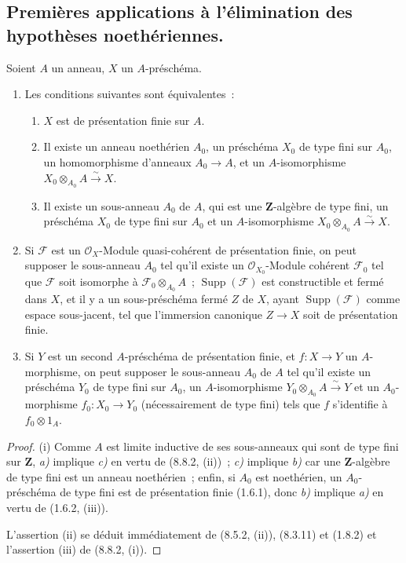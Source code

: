 \subsection{Premières applications à l'élimination des hypothèses noethériennes.}
\label{subsection:IV.8.9-fr}

\begin{proposition}[8.9.1]
Soient $A$ un anneau, $X$ un $A$-préschéma.
\begin{enumerate}
\item[\textup{(i)}] Les conditions suivantes sont équivalentes~:
\begin{enumerate}
\item[\emph{a)}] $X$ est de présentation finie sur $A$.
\item[\emph{b)}] Il existe un anneau noethérien $A_0$, un préschéma $X_0$ de
type fini sur $A_0$, un homomorphisme d'anneaux $A_0\to A$, et un
$A$-isomorphisme $X_0\otimes_{A_0}A\xrightarrow{\sim}X$.
\item[\emph{c)}] Il existe un sous-anneau $A_0$ de $A$, qui est une
$\mathbf Z$-algèbre de type fini, un préschéma $X_0$ de type fini sur $A_0$ et
un $A$-isomorphisme $X_0\otimes_{A_0}A\xrightarrow{\sim}X$.
\end{enumerate}
\item[\textup{(ii)}] Si $\mathcal F$ est un $\mathcal O_X$-Module quasi-cohérent de
présentation finie, on peut supposer le sous-anneau $A_0$ tel qu'il existe un
$\mathcal O_{X_0}$-Module cohérent $\mathcal F_0$ tel que $\mathcal F$ soit
isomorphe à $\mathcal F_0\otimes_{A_0}A$~;
$\operatorname{Supp}(\mathcal F)$ est constructible et fermé dans $X$, et il
y a un sous-préschéma fermé $Z$ de $X$, ayant
$\operatorname{Supp}(\mathcal F)$ comme espace sous-jacent, tel que
l'immersion canonique $Z\to X$ soit de présentation finie.
\item[\textup{(iii)}] Si $Y$ est un second $A$-préschéma de présentation finie, et
$f:X\to Y$ un $A$-morphisme, on peut supposer le sous-anneau $A_0$ de $A$ tel
qu'il existe un préschéma $Y_0$ de type fini sur $A_0$, un $A$-isomorphisme
$Y_0\otimes_{A_0}A\xrightarrow{\sim}Y$ et un $A_0$-morphisme
$f_0:X_0\to Y_0$ (nécessairement de type fini) tels que $f$ s'identifie à
$f_0\otimes1_A$.
\end{enumerate}
\end{proposition}

\begin{proof}
(i) Comme $A$ est limite inductive de ses sous-anneaux qui sont de type fini
sur $\mathbf Z$, \emph{a)} implique \emph{c)} en vertu de (8.8.2, (ii))~;
\emph{c)} implique \emph{b)} car une $\mathbf Z$-algèbre de type fini est un
anneau noethérien~; enfin, si $A_0$ est noethérien, un $A_0$-préschéma de type
fini est de présentation finie (1.6.1), donc \emph{b)} implique \emph{a)}
en vertu de (1.6.2, (iii)).

L'assertion (ii) se déduit immédiatement de (8.5.2, (ii)), (8.3.11) et
(1.8.2) et l'assertion (iii) de (8.8.2, (i)).
\end{proof}

